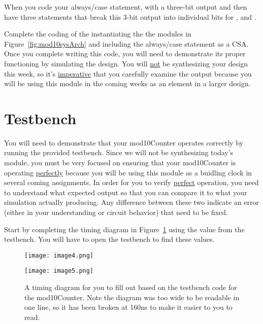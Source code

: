 When you code your always/case statement, with a three-bit output and
then have three  statements that break this 3-bit output
into individual bits for ,  and .

\hypertarget{link:mod10Verilog}{}{}
Complete the coding of the  instantiating the
the modules in Figure~\ref{fig:mod10sysArch} and including the
always/case statement as a CSA.  Once you complete writing this
code, you will need to demonstrate its proper functioning by
simulating the design.  You will \underline{not} be synthesizing 
your design this week, so it's \underline{imperative} that you carefully
examine the output because you will be using this module
in the coming weeks as an element in a larger design.


\section{Testbench}

You will need to demonstrate that your mod10Counter operates correctly
by running the provided testbench. Since we will not be synthesizing
today's module, you must be very focused on ensuring that your
mod10Counter is operating \underline{perfectly} because you will
be using this module as a buidling clock in several coming assignments.
In order for you to verify \underline{perfect} operation, you need to understand 
what expected output so that you can compare it to what your simulation actually
producing. Any difference between these two indicate an error (either in
your understanding or circuit behavior) that need to be fixed. 

Start by completing the timing diagram in Figure~\ref{fig:mod10TimingDiamgram} 
using the value from the testbench.  You will have to open the testbench to 
find these values.

\begin{landscape}
\begin{figure}[ht]
\texttt{[image: image4.png]}

\texttt{[image: image5.png]}

\caption{A timing diagram for you to fill out based on the testbench
code for the mod10Counter. Note the diagram was too wide to be readable
in one line, so it has been broken at 160ns to make it easier to
you to read.}
\label{fig:mod10TimingDiamgram}
\end{figure}
\end{landscape}

